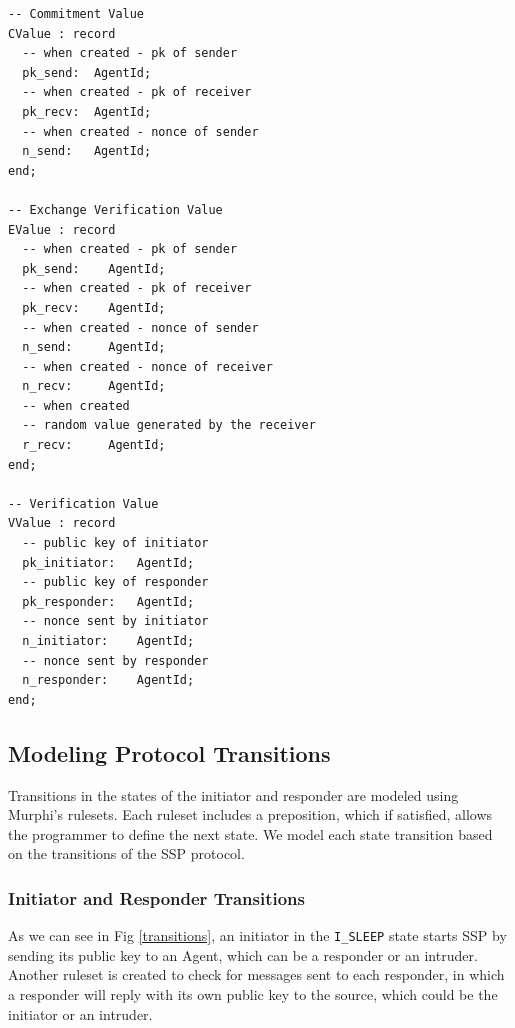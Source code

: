 \documentclass{acm_proc_article-sp}
\begin{document}
\begin{verbatim}
-- Commitment Value
CValue : record
  -- when created - pk of sender
  pk_send:  AgentId;
  -- when created - pk of receiver
  pk_recv:  AgentId;
  -- when created - nonce of sender
  n_send:   AgentId;
end;

-- Exchange Verification Value
EValue : record
  -- when created - pk of sender
  pk_send:    AgentId;
  -- when created - pk of receiver
  pk_recv:    AgentId;
  -- when created - nonce of sender
  n_send:     AgentId;
  -- when created - nonce of receiver
  n_recv:     AgentId;
  -- when created
  -- random value generated by the receiver
  r_recv:     AgentId;
end;

-- Verification Value
VValue : record
  -- public key of initiator
  pk_initiator:   AgentId;
  -- public key of responder
  pk_responder:   AgentId;
  -- nonce sent by initiator
  n_initiator:    AgentId;
  -- nonce sent by responder
  n_responder:    AgentId;
end;
\end{verbatim}

\subsection{Modeling Protocol Transitions}
Transitions in the states of the initiator and responder are modeled using Murphi's rulesets. Each ruleset includes a preposition, which if satisfied, allows the programmer to define the next state. We model each state transition based on the transitions of the SSP protocol.

\subsubsection{Initiator and Responder Transitions}

As we can see in Fig \ref{transitions}, an initiator in the \texttt{I\_SLEEP} state starts SSP by sending its public key to an Agent, which can be a responder or an intruder. Another ruleset is created to check for messages sent to each responder, in which a responder will reply with its own public key to the source, which could be the initiator or an intruder.
\end{document}
